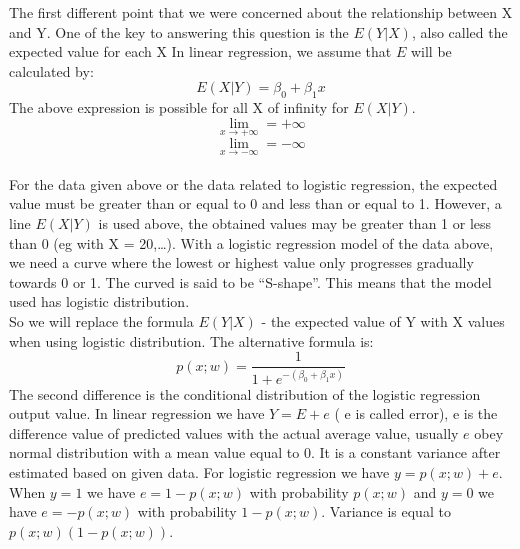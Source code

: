 \documentclass{article}
\begin{document}
    The first different point that we were concerned about the relationship between X and Y. One of the key to answering this question is the $E(Y | X)$, also called the expected value for each X In linear regression, we assume that $E$ will be calculated by:
    \begin{equation} 
        E(X | Y) = \beta_{0} + \beta_{1}x
    \end{equation} 
    The above expression is possible for all X of infinity for $E (X | Y)$.
    \begin{equation} 
        \lim_{x \to +\infty} = +\infty
    \end{equation} 
    \begin{equation} 
        \lim_{x \to -\infty} = -\infty
    \end{equation}
    \\
    For the data given above or the data related to logistic regression, the expected value must be greater than or equal to 0 and less than or equal to 1. However, a line $E (X | Y)$ is used above, the obtained values may be greater than 1 or less than 0 (eg with X = 20,…). With a logistic regression model of the data above, we need a curve where the lowest or highest value only progresses gradually towards 0 or 1. The curved is said to be “S-shape”. This means that the model used has logistic distribution.
    \\
    So we will replace the formula $E(Y | X)$ -  the expected value of Y with X values when using logistic distribution. The alternative formula is:
    \begin{equation} 
    \label {alternative f}
        p(x; w) = \dfrac{1}{1 + e^{-(\beta_{0} + \beta_{1}x)}}
    \end{equation}
    The second difference is the conditional distribution of the logistic regression output value. In linear regression we have $Y = E + e$ ( e is called error), e is the difference value of predicted values with the actual average value, usually $e$ obey normal distribution with a mean value equal to $0$. It is a constant variance after estimated based on given data. For logistic regression we have $y = p(x; w)  + e$. When $y = 1$ we have $e = 1 - p(x; w)$ with  probability $p(x; w)$ and $y = 0$ we have $e = -p(x; w)$ with probability $1 - p(x;w)$. Variance is equal to $p(x; w) (1 - p(x;w))$.
    
\end{document}
